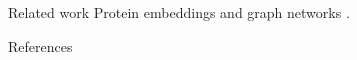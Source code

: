 \documentclass{beamer}
\begin{document}
\begin{frame}{Related work}
  Protein embeddings \cite{elnaggar2021} and graph networks \cite{kipf2017}.
\end{frame}
\begin{frame}{References}
  
  
\end{frame}
\end{document}
